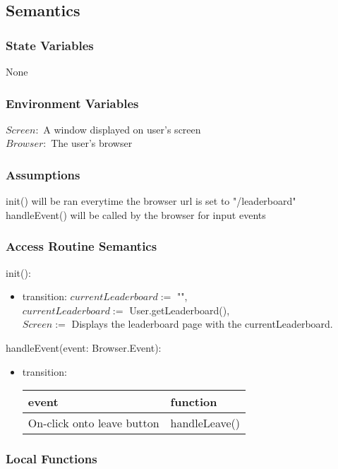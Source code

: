 \documentclass[12pt, titlepage]{article}
\begin{document}
\subsection{Semantics}

\subsubsection{State Variables}
None
\subsubsection{Environment Variables}

$Screen: $ A window displayed on user's screen\\
$Browser: $ The user's browser

\subsubsection{Assumptions}

init() will be ran everytime the browser url is set to "/leaderboard"\\
handleEvent() will be called by the browser for input events

\subsubsection{Access Routine Semantics}

\noindent init():
\begin{itemize}
\item transition: $currentLeaderboard :=$ "",\\
$currentLeaderboard :=$ User.getLeaderboard(),\\
$Screen :=$ Displays the leaderboard page with the currentLeaderboard. 
\end{itemize}

\noindent handleEvent(event: Browser.Event):
\begin{itemize}
\item transition: \begin{tabular}{p{5cm} p{4cm}}
\hline
\textbf{event} & \textbf{function} \\
\hline
On-click onto leave button & handleLeave() \\
\hline
\end{tabular}
    
\end{itemize}

\subsubsection{Local Functions}
\end{document}
